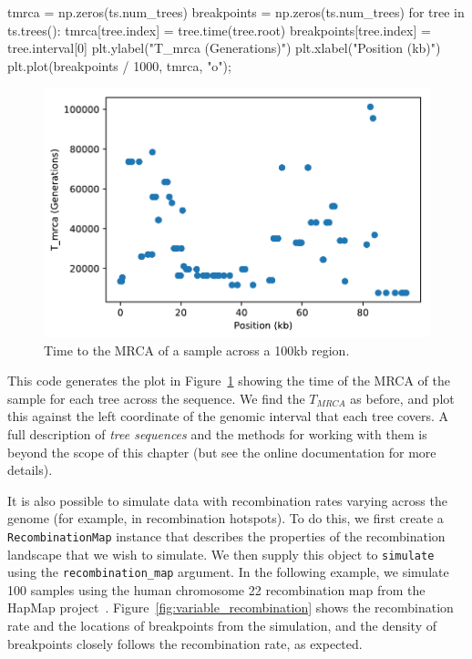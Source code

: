 \documentclass[graybox]{svmult}
\begin{document}
\begin{pythoncode}
tmrca = np.zeros(ts.num_trees)
breakpoints = np.zeros(ts.num_trees)
for tree in ts.trees():
    tmrca[tree.index] = tree.time(tree.root)
    breakpoints[tree.index] = tree.interval[0]
plt.ylabel("T_mrca (Generations)")
plt.xlabel("Position (kb)")
plt.plot(breakpoints / 1000, tmrca, "o");
\end{pythoncode}

\begin{figure}
\begin{center}
\includegraphics[width=\textwidth]{images/plot_10.pdf}
\end{center}
\caption{\label{fig:tree_tmrcas}Time to the MRCA of
a sample across a 100kb region.}
\end{figure}

This code generates the plot in Figure~\ref{fig:tree_tmrcas} showing the time of the MRCA of the sample for each tree across the
sequence. We find the \(T_{MRCA}\) as before, and plot this against the
left coordinate of the genomic interval that each tree covers. A full description of
\emph{tree sequences} and the methods for working with them is beyond the scope of this chapter (but see the online documentation for more details).

It is also possible to simulate data with recombination rates varying
across the genome (for example, in recombination hotspots). To do this, we
first create a \texttt{RecombinationMap} instance that describes the
properties of the recombination landscape that we wish to simulate. We
then supply this object to \texttt{simulate} using the
\texttt{recombination\_map} argument. In the following example, we
simulate 100 samples using the human chromosome 22 recombination map
from the HapMap project~\citep{international2003international}.
Figure~\ref{fig:variable_recombination} shows the
recombination rate and the locations of breakpoints
from the simulation, and the density of breakpoints closely follows the
recombination rate, as expected.
\end{document}
